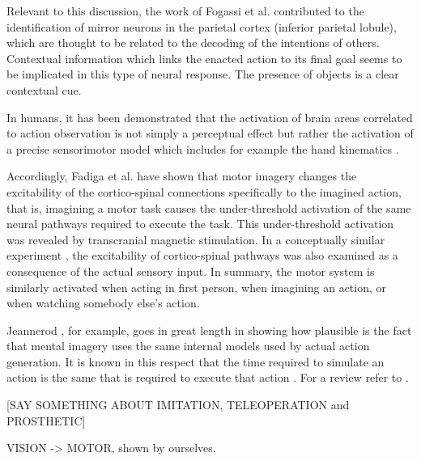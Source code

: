 Relevant to this discussion, the work of Fogassi et al. \cite{fogassi-05} contributed to the 
identification of mirror neurons in the parietal cortex (inferior parietal lobule), which are 
thought to be related to the decoding of the intentions of others. Contextual information 
which links the enacted action to its final goal seems to be implicated in this type of neural 
response. The presence of objects is a clear contextual cue.

In humans, it has been demonstrated that the activation of brain areas correlated to 
action observation is not simply a perceptual effect but rather the activation of
a precise sensorimotor model which includes for example the hand kinematics \cite{pozzo-06}.
 
Accordingly, Fadiga et al. \cite{fadiga-99,vargas-04} have shown that motor imagery changes
the excitability of the cortico-spinal connections specifically to the imagined action, that is, 
imagining a motor task causes the under-threshold activation of the same neural pathways 
required to execute the task. This under-threshold activation was revealed 
by transcranial magnetic stimulation. In a conceptually similar experiment 
\cite{fadiga-05}, the excitability of cortico-spinal pathways was also examined as a consequence 
of the actual sensory input. In summary, the motor system is similarly activated 
when acting in first person, when imagining an action, or when watching somebody else's action.


Jeannerod \cite{jeannerod-88}, for example, goes in great length in showing how plausible is the fact that
mental imagery uses the same internal models used by actual action generation. It is known in 
this respect that the time required to simulate an action is the same that is required to 
execute that action \cite{sirigu-96}. For a review refer to \cite{jeannerod-99}.




[SAY SOMETHING ABOUT IMITATION, TELEOPERATION and PROSTHETIC]

VISION -> MOTOR, shown by ourselves.